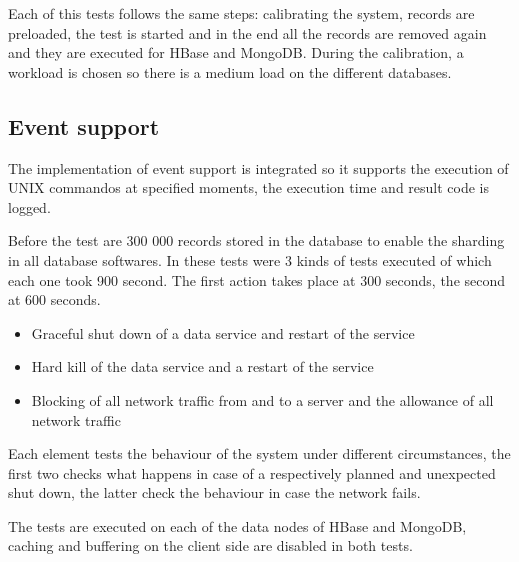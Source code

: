 \documentclass[final,5p,times]{elsarticle}
\begin{document}
Each of this tests follows the same steps: calibrating the system, records are preloaded, the test is started and in the end all the records are removed again and they are executed for HBase and MongoDB. During the calibration, a workload is chosen so there is a medium load on the different databases. 

\subsection{Event support}
The implementation of event support is integrated so it supports the execution of UNIX commandos at specified moments, the execution time and result code is logged. 

Before the test are 300 000 records stored in the database to enable the sharding in all database softwares. In these tests were 3 kinds of tests executed of which each one took 900 second. The first action takes place at 300 seconds, the second at 600 seconds.
\begin{itemize}
\item Graceful shut down of a data service and restart of the service
\item Hard kill of the data service and a restart of the service
\item Blocking of all network traffic from and to a server and the allowance of all network traffic
\end{itemize}

Each element tests the behaviour of the system under different circumstances, the first two checks what happens in case of a respectively planned and unexpected shut down, the latter check the behaviour in case the network fails. 

The tests are executed on each of the data nodes of HBase and MongoDB, caching and buffering on the client side are disabled in both tests. 
\end{document}
